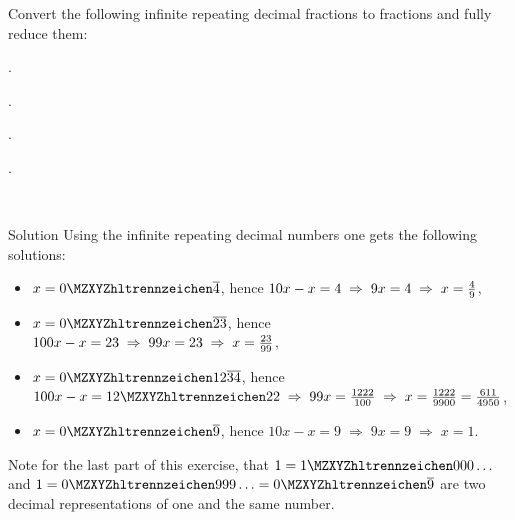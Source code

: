 \begin{MExercises}
\begin{MExercise}
Convert the following infinite repeating decimal fractions to fractions and fully reduce them:
\begin{MExerciseItems}
\item{.}
\item{.}
\item{.}
\item{.}
\end{MExerciseItems}
\end{MExercise}
\ \\
\begin{MHint}{Solution}
Using the  infinite repeating decimal numbers one gets the following solutions:
\begin{itemize}
\item{$x=\MZahl{0}{}\overline{4}$, hence $\displaystyle 10x-x=4\;\Rightarrow\;9x=4\;\Rightarrow\;x=\tfrac{4}{9}$,}
\item{$x=\MZahl{0}{}\overline{23}$, hence $\displaystyle 100x-x=23\;\Rightarrow\;99x=23\;\Rightarrow\; x=\tfrac{23}{99}$,}
\item{$x=\MZahl{0}{12}\overline{34}$, hence $\displaystyle 100x-x=\MZahl{12}{22}\;\Rightarrow\;99x=\Mtfrac{1222}{100}\;\Rightarrow\;x=\Mtfrac{1222}{9900}=\Mtfrac{611}{4950}$,}
\item{$x=\MZahl{0}{}\overline{9}$, hence $\displaystyle 10x-x=9\;\Rightarrow\;9x=9\;\Rightarrow\;x=1$.}
 \end{itemize}
 Note for the last part of this exercise, that $1=\MZahl{1}{000}\ldots$ and $1=\MZahl{0}{999}\ldots=\MZahl{0}{}\overline{9}$
are two decimal representations of one and the same number.
\end{MHint}
\end{MExercises}



